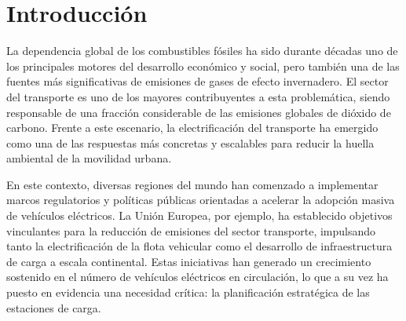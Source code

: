 \documentclass[letter, 10pt]{article}
\begin{document}
\begin{abstract}
El presente informe aborda el Problema de Ubicación de Estaciones de Carga para
Vehículos Eléctricos (EVCSPP), un problema de optimización combinatoria NP-duro que busca
determinar las ubicaciones óptimas para construir estaciones de carga en una red urbana,
minimizando el costo de construcción y garantizando criterios de accesibilidad, satisfacción de
demanda y cobertura territorial. Para resolverlo se implementó un algoritmo genético con
codificación binaria, manejo de las restricciones por penalización y un criterio de parada por
estancamiento. El algoritmo se evaluó sobre instancias reales de 100 ubicaciones mediante un
barrido de 250 corridas que combinó el coeficiente $\alpha$ del problema con el tamaño de la
población, empleando distintas semillas como réplicas. Los resultados muestran, por un lado, que el
aumento de $\alpha$ conduce a redes más dispersas y realistas hasta una frontera a partir de la
cual el problema se vuelve infactible por construcción; y, por otro, que en este problema el
esfuerzo computacional, y no el tamaño de la población, es la palanca del rendimiento: una
población pequeña alcanza soluciones de menor costo que una veinte veces mayor, gastando alrededor
de dieciséis veces menos evaluaciones de la función de aptitud.
\end{abstract}
\newpage

\section{Introducci\'on}
La dependencia global de los combustibles fósiles ha sido durante décadas uno de los
principales motores del desarrollo económico y social, pero también una de las fuentes 
más significativas de emisiones de gases de efecto invernadero. El sector del transporte 
es uno de los mayores contribuyentes a esta problemática, siendo responsable de una 
fracción considerable de las emisiones globales de dióxido de carbono. Frente a este 
escenario, la electrificación del transporte ha emergido como una de las respuestas más 
concretas y escalables para reducir la huella ambiental de la movilidad urbana.

En este contexto, diversas regiones del mundo han comenzado a implementar marcos 
regulatorios y políticas públicas orientadas a acelerar la adopción masiva de vehículos 
eléctricos. La Unión Europea, por ejemplo, ha establecido objetivos vinculantes para la 
reducción de emisiones del sector transporte, impulsando tanto la electrificación de la 
flota vehicular como el desarrollo de infraestructura de carga a escala continental. Estas 
iniciativas han generado un crecimiento sostenido en el número de vehículos eléctricos 
en circulación, lo que a su vez ha puesto en evidencia una necesidad crítica: la 
planificación estratégica de las estaciones de carga.
\end{document}
